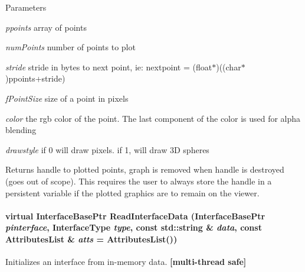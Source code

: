 \begin{DoxyParams}{Parameters}
\item[{\em ppoints}]array of points \item[{\em numPoints}]number of points to plot \item[{\em stride}]stride in bytes to next point, ie: nextpoint = (float$\ast$)((char$\ast$)ppoints+stride) \item[{\em fPointSize}]size of a point in pixels \item[{\em color}]the rgb color of the point. The last component of the color is used for alpha blending \item[{\em drawstyle}]if 0 will draw pixels. if 1, will draw 3D spheres \end{DoxyParams}
\begin{DoxyReturn}{Returns}
handle to plotted points, graph is removed when handle is destroyed (goes out of scope). This requires the user to always store the handle in a persistent variable if the plotted graphics are to remain on the viewer. 
\end{DoxyReturn}
\hypertarget{classOpenRAVE_1_1EnvironmentBase_aceef6e28746bc88931aa1c863c9478f6}{
\paragraph[{ReadInterfaceData}]{\setlength{\rightskip}{0pt plus 5cm}virtual InterfaceBasePtr ReadInterfaceData (InterfaceBasePtr {\em pinterface}, \/  InterfaceType {\em type}, \/  const std::string \& {\em data}, \/  const AttributesList \& {\em atts} = {\ttfamily AttributesList()})}\hfill}
\label{classOpenRAVE_1_1EnvironmentBase_aceef6e28746bc88931aa1c863c9478f6}


Initializes an interface from in-\/memory data. {\bfseries \mbox{[}multi-\/thread safe\mbox{]}} 


